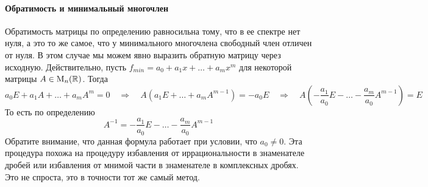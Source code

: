 \paragraph{Обратимость и минимальный многочлен}

Обратимость матрицы по определению равносильна тому, что в ее спектре нет нуля, а это то же самое, что у минимального многочлена свободный член отличен от нуля.
В этом случае мы можем явно выразить обратную матрицу через исходную.
Действительно, пусть $f_{min} = a_0 + a_1 x + \ldots + a_m x^m$ для некоторой матрицы $A\in \operatorname{M}_{n}(\mathbb R)$.
Тогда
\[
a_0E + a_1 A + \ldots + a_m A^m =  0 \quad\Rightarrow\quad  A (a_1 E + \ldots + a_m A^{m-1}) =  -a_0 E \quad\Rightarrow\quad A \left(-\frac{a_1}{a_0} E - \ldots -\frac{ a_m}{a_0} A^{m-1}\right) = E
\]
То есть по определению
\[
A^{-1} = -\frac{a_1}{a_0} E - \ldots -\frac{ a_m}{a_0} A^{m-1}
\]
Обратите внимание, что данная формула работает при условии, что $a_0 \neq 0$.
Эта процедура похожа на процедуру избавления от иррациональности в знаменателе дробей или избавления от мнимой части в знаменателе в комплексных дробях.
Это не спроста, это в точности тот же самый метод.
